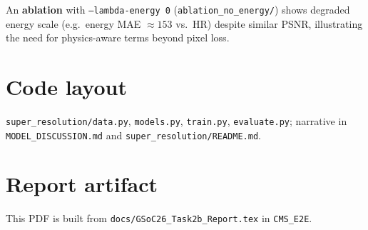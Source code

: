 \documentclass[11pt,a4paper]{article}
\begin{document}
An \textbf{ablation} with \texttt{--lambda-energy 0} (\texttt{ablation\_no\_energy/}) shows degraded energy scale (e.g.\ energy MAE $\approx 153$ vs.\ HR) despite similar PSNR, illustrating the need for physics-aware terms beyond pixel loss.

\section{Code layout}
\texttt{super\_resolution/data.py}, \texttt{models.py}, \texttt{train.py}, \texttt{evaluate.py}; narrative in \texttt{MODEL\_DISCUSSION.md} and \texttt{super\_resolution/README.md}.

\section*{Report artifact}
This PDF is built from \texttt{docs/GSoC26\_Task2b\_Report.tex} in \texttt{CMS\_E2E}.
\end{document}

